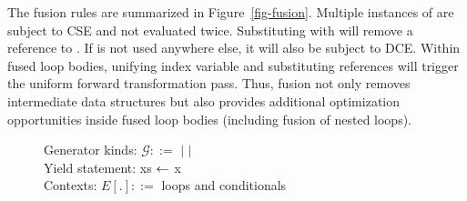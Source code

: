 The fusion rules are summarized in Figure~\ref{fig-fusion}.
Multiple instances of  are subject to CSE and not evaluated twice.
Substituting  with  will remove a reference to .
If  is not used anywhere else, it will also be subject to DCE.
Within fused loop bodies, unifying index variable  and substituting
references will trigger the uniform forward transformation pass.
Thus, fusion not only removes intermediate data structures but also provides
additional optimization opportunities inside fused loop bodies
(including fusion of nested loops).

\begin{figure}

Generator kinds: $\mathcal{G} ::= $  $|$  $|$  \\
Yield statement: xs $\leftarrow$ x \\
Contexts: $E[.] ::= $ loops and conditionals \\[-4pt]


\end{figure}
